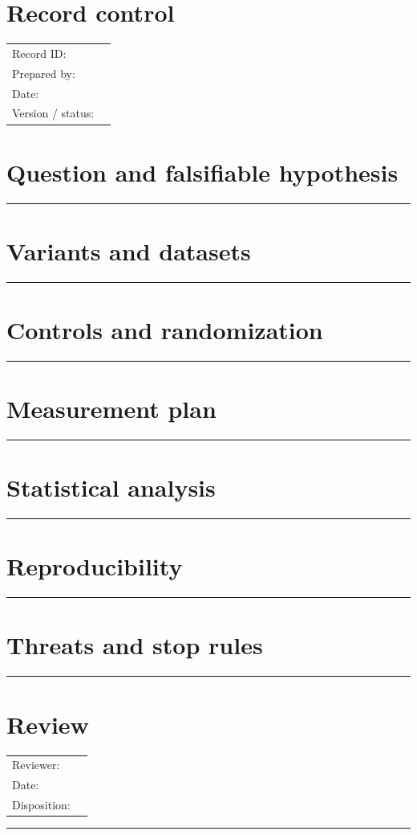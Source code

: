 \documentclass[11pt]{article}
\begin{document}
\makedoctitle
\section{Record control}
\begin{tabularx}{\linewidth}{@{}lX@{}}Record ID: & \hrulefill \\ Prepared by: & \hrulefill \\ Date: & \hrulefill \\ Version / status: & \hrulefill \\\end{tabularx}
\section{Question and falsifiable hypothesis}
\vspace{1.75cm}\hrule\vspace{0.35cm}
\section{Variants and datasets}
\vspace{1.75cm}\hrule\vspace{0.35cm}
\section{Controls and randomization}
\vspace{1.75cm}\hrule\vspace{0.35cm}
\section{Measurement plan}
\vspace{1.75cm}\hrule\vspace{0.35cm}
\section{Statistical analysis}
\vspace{1.75cm}\hrule\vspace{0.35cm}
\section{Reproducibility}
\vspace{1.75cm}\hrule\vspace{0.35cm}
\section{Threats and stop rules}
\vspace{1.75cm}\hrule\vspace{0.35cm}
\section{Review}\begin{tabularx}{\linewidth}{@{}lX@{}}Reviewer: & \hrulefill \\ Date: & \hrulefill \\ Disposition: & \hrulefill \\\end{tabularx}\vspace{0.9cm}\hrule
\end{document}
